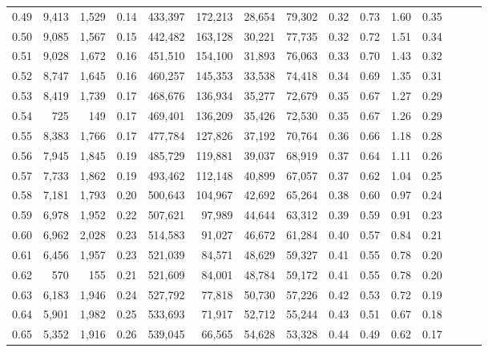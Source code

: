 \begin{tabular}{rrrrrrrrrrrrrrr}
0.49 &   9,413 &  1,529 &  0.14 &  433,397 &  172,213 &   28,654 &   79,302 &  0.32 &  0.73 &  1.60 &      0.35 \\
0.50 &   9,085 &  1,567 &  0.15 &  442,482 &  163,128 &   30,221 &   77,735 &  0.32 &  0.72 &  1.51 &      0.34 \\
0.51 &   9,028 &  1,672 &  0.16 &  451,510 &  154,100 &   31,893 &   76,063 &  0.33 &  0.70 &  1.43 &      0.32 \\
0.52 &   8,747 &  1,645 &  0.16 &  460,257 &  145,353 &   33,538 &   74,418 &  0.34 &  0.69 &  1.35 &      0.31 \\
0.53 &   8,419 &  1,739 &  0.17 &  468,676 &  136,934 &   35,277 &   72,679 &  0.35 &  0.67 &  1.27 &      0.29 \\
0.54 &     725 &    149 &  0.17 &  469,401 &  136,209 &   35,426 &   72,530 &  0.35 &  0.67 &  1.26 &      0.29 \\
0.55 &   8,383 &  1,766 &  0.17 &  477,784 &  127,826 &   37,192 &   70,764 &  0.36 &  0.66 &  1.18 &      0.28 \\
0.56 &   7,945 &  1,845 &  0.19 &  485,729 &  119,881 &   39,037 &   68,919 &  0.37 &  0.64 &  1.11 &      0.26 \\
0.57 &   7,733 &  1,862 &  0.19 &  493,462 &  112,148 &   40,899 &   67,057 &  0.37 &  0.62 &  1.04 &      0.25 \\
0.58 &   7,181 &  1,793 &  0.20 &  500,643 &  104,967 &   42,692 &   65,264 &  0.38 &  0.60 &  0.97 &      0.24 \\
0.59 &   6,978 &  1,952 &  0.22 &  507,621 &   97,989 &   44,644 &   63,312 &  0.39 &  0.59 &  0.91 &      0.23 \\
0.60 &   6,962 &  2,028 &  0.23 &  514,583 &   91,027 &   46,672 &   61,284 &  0.40 &  0.57 &  0.84 &      0.21 \\
0.61 &   6,456 &  1,957 &  0.23 &  521,039 &   84,571 &   48,629 &   59,327 &  0.41 &  0.55 &  0.78 &      0.20 \\
0.62 &     570 &    155 &  0.21 &  521,609 &   84,001 &   48,784 &   59,172 &  0.41 &  0.55 &  0.78 &      0.20 \\
0.63 &   6,183 &  1,946 &  0.24 &  527,792 &   77,818 &   50,730 &   57,226 &  0.42 &  0.53 &  0.72 &      0.19 \\
0.64 &   5,901 &  1,982 &  0.25 &  533,693 &   71,917 &   52,712 &   55,244 &  0.43 &  0.51 &  0.67 &      0.18 \\
0.65 &   5,352 &  1,916 &  0.26 &  539,045 &   66,565 &   54,628 &   53,328 &  0.44 &  0.49 &  0.62 &      0.17 \\

\end{tabular}
